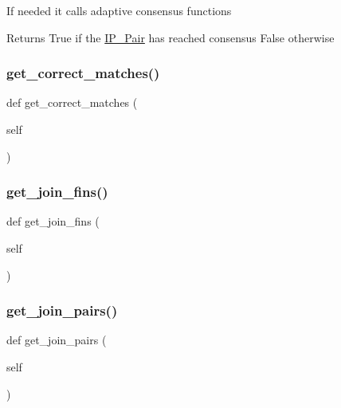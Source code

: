 If needed it calls adaptive consensus functions \begin{DoxyReturn}{Returns}
True if the \mbox{\hyperlink{classdynamicfilterapp_1_1models_1_1_i_p___pair}{I\+P\+\_\+\+Pair}} has reached consensus False otherwise 
\end{DoxyReturn}
\mbox{\label{classdynamicfilterapp_1_1models_1_1_i_p___pair_ac0edbf94b370ed541539c84ecfede353}} 
\subsubsection{\texorpdfstring{get\_correct\_matches()}{get\_correct\_matches()}}
{\footnotesize\ttfamily def get\+\_\+correct\+\_\+matches (\begin{DoxyParamCaption}\item[{}]{self }\end{DoxyParamCaption})}

\mbox{\label{classdynamicfilterapp_1_1models_1_1_i_p___pair_ad4a4fd5953d6391fe93c0313af62179f}} 
\subsubsection{\texorpdfstring{get\_join\_fins()}{get\_join\_fins()}}
{\footnotesize\ttfamily def get\+\_\+join\+\_\+fins (\begin{DoxyParamCaption}\item[{}]{self }\end{DoxyParamCaption})}

\mbox{\label{classdynamicfilterapp_1_1models_1_1_i_p___pair_a5a823d5be0be531512663d1c5a449e80}} 
\subsubsection{\texorpdfstring{get\_join\_pairs()}{get\_join\_pairs()}}
{\footnotesize\ttfamily def get\+\_\+join\+\_\+pairs (\begin{DoxyParamCaption}\item[{}]{self }\end{DoxyParamCaption})}

